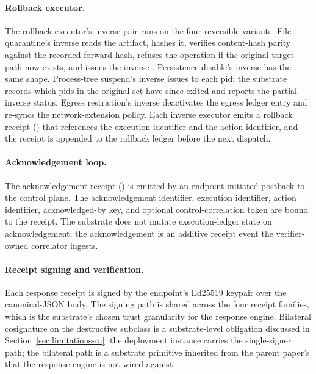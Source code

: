 \paragraph{Rollback executor.}
The rollback executor's inverse pair runs on the four reversible
variants. File quarantine's inverse reads the artifact, hashes it,
verifies content-hash parity against the recorded forward hash,
refuses the operation if the original target path now exists, and
issues the inverse . Persistence disable's
inverse has the same shape. Process-tree suspend's inverse issues
 to each pid; the substrate records which pids
in the original set have since exited and reports the partial-inverse
status. Egress restriction's inverse deactivates the egress ledger
entry and re-syncs the network-extension policy. Each inverse
executor emits a rollback receipt
() that references the
execution identifier and the action identifier, and the receipt is
appended to the rollback ledger before the next dispatch.

\paragraph{Acknowledgement loop.}
The acknowledgement receipt
() is emitted by an
endpoint-initiated postback to the control plane. The acknowledgement
identifier, execution identifier, action identifier, acknowledged-by
key, and optional control-correlation token are bound to the receipt.
The substrate does not mutate execution-ledger state on
acknowledgement; the acknowledgement is an additive receipt event the
verifier-owned correlator ingests.

\paragraph{Receipt signing and verification.}
Each response receipt is signed by the endpoint's Ed25519 keypair over
the canonical-JSON body. The signing path is shared across the four
receipt families, which is the substrate's chosen trust granularity
for the response engine. Bilateral cosignature on the destructive
subclass is a substrate-level obligation discussed in
Section~\ref{sec:limitations-ra}: the deployment instance carries the
single-signer path; the bilateral path is a substrate primitive
inherited from the parent paper's
 that the
response engine is not wired against.

